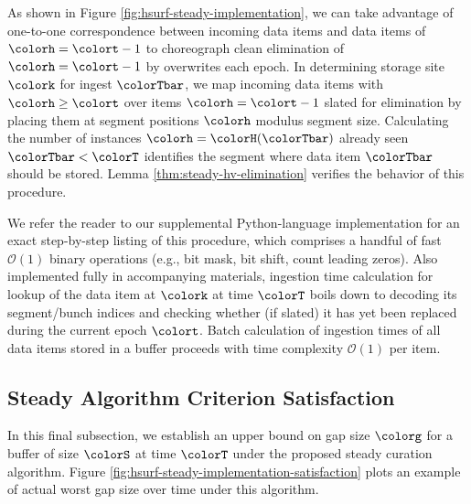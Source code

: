 As shown in Figure \ref{fig:hsurf-steady-implementation}, we can take advantage of one-to-one correspondence between incoming data items and data items of \hv{} $\colorh=\colort-1$ to choreograph clean elimination of \hv{} $\colorh=\colort-1$ by overwrites each epoch.
In determining storage site $\colork$ for ingest $\colorTbar$, we map incoming data items with \hv{} $\colorh \geq \colort$ over items $\colorh = \colort - 1$ slated for elimination by placing them at segment positions $\colorh$ modulus segment size.
Calculating the number of \hv{} instances $\colorh = \colorH(\colorTbar)$ already seen $\colorTbar < \colorT$ identifies the segment where data item $\colorTbar$ should be stored.
Lemma \ref{thm:steady-hv-elimination} verifies the behavior of this procedure.

We refer the reader to our supplemental Python-language implementation for an exact step-by-step listing of this procedure, which comprises a handful of fast $\mathcal{O}(1)$ binary operations (e.g., bit mask, bit shift, count leading zeros).
Also implemented fully in accompanying materials, ingestion time calculation for lookup of the data item at $\colork$ at time $\colorT$ boils down to decoding its segment/bunch indices and checking whether (if slated) it has yet been replaced during the current epoch $\colort$.
Batch calculation of ingestion times of all data items stored in a buffer proceeds with time complexity $\mathcal{O}(1)$ per item.

\subsection{Steady Algorithm Criterion Satisfaction}
\label{sec:stready-satisfaction}

In this final subsection, we establish an upper bound on gap size $\colorg$ for a buffer of size $\colorS$ at time $\colorT$ under the proposed steady curation algorithm.
Figure \ref{fig:hsurf-steady-implementation-satisfaction} plots an example of actual worst gap size over time under this algorithm.


